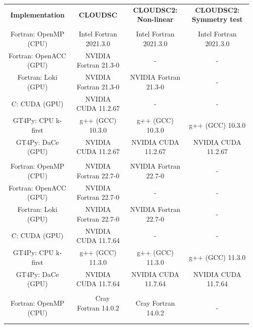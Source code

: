 \documentclass[main.tex]{subfiles}
\begin{document}
    \begin{table}[t!]
        \setlength\extrarowheight{2pt}
        \centering
        \begin{footnotesize}
            \begin{tabular}{|c|c|c|c|}
                 \hline
                 \textbf{Implementation} & \textbf{CLOUDSC} & \textbf{CLOUDSC2: Non-linear} & \textbf{CLOUDSC2: Symmetry test} \\
                 \hhline{|====|}
                 \multicolumn{4}{|c|}{\textbf{Piz Daint}} \\
                 \hline
                 Fortran: OpenMP (CPU) & Intel Fortran 2021.3.0 & Intel Fortran 2021.3.0 & Intel Fortran 2021.3.0 \\
                 Fortran: OpenACC (GPU) & NVIDIA Fortran 21.3-0 & - & - \\
                 Fortran: Loki (GPU) & NVIDIA Fortran 21.3-0 & NVIDIA Fortran 21.3-0 & - \\
                 C: CUDA (GPU) & NVIDIA CUDA 11.2.67 & - & - \\
                 GT4Py: CPU k-first & g++ (GCC) 10.3.0 & g++ (GCC) 10.3.0 & g++ (GCC) 10.3.0 \\
                 GT4Py: DaCe (GPU) & NVIDIA CUDA 11.2.67 & NVIDIA CUDA 11.2.67 & NVIDIA CUDA 11.2.67 \\
                 \hhline{|====|}
                 \multicolumn{4}{|c|}{\textbf{MeluXina}} \\
                 \hline
                 Fortran: OpenMP (CPU) & NVIDIA Fortran 22.7-0 & NVIDIA Fortran 22.7-0 & - \\
                 Fortran: OpenACC (GPU) & NVIDIA Fortran 22.7-0 & - & - \\
                 Fortran: Loki (GPU) & NVIDIA Fortran 22.7-0 & NVIDIA Fortran 22.7-0 & - \\
                 C: CUDA (GPU) & NVIDIA CUDA 11.7.64 & - & - \\
                 GT4Py: CPU k-first & g++ (GCC) 11.3.0 & g++ (GCC) 11.3.0 & g++ (GCC) 11.3.0 \\
                 GT4Py: DaCe (GPU) & NVIDIA CUDA 11.7.64 & NVIDIA CUDA 11.7.64 & NVIDIA CUDA 11.7.64 \\
                 \hhline{|====|}
                 \multicolumn{4}{|c|}{\textbf{LUMI}} \\
                 \hline
                 Fortran: OpenMP (CPU) & ~~ Cray Fortran 14.0.2 ~~ & Cray Fortran 14.0.2 & - \\

\end{tabular}
\end{footnotesize}
\end{table}
\end{document}
